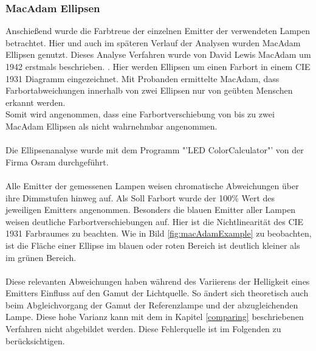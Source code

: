 \documentclass[11pt]{scrartcl}
\begin{document}
\subsubsection{MacAdam Ellipsen}
Anschießend wurde die Farbtreue der einzelnen Emitter der verwendeten Lampen betrachtet. Hier und auch im späteren Verlauf der Analysen wurden MacAdam Ellipsen
genutzt. Dieses Analyse Verfahren wurde von David Lewis MacAdam um 1942 erstmals beschrieben. \cite{macAdam}. Hier werden Ellipsen um einen Farbort in einem CIE
1931 Diagramm eingezeichnet. Mit Probanden ermittelte MacAdam, dass Farbortabweichungen innerhalb von zwei Ellipsen nur von geübten Menschen erkannt werden.\\
Somit wird angenommen, dass eine Farbortverschiebung von bis zu zwei MacAdam Ellipsen als nicht wahrnehmbar angenommen.\\ %
\\
Die Ellipsenanalyse wurde mit dem Programm "'LED ColorCalculator"' von der Firma Osram durchgeführt. \cite{osram}\\
\\
Alle Emitter der gemessenen Lampen weisen chromatische Abweichungen über ihre Dimmstufen hinweg auf. Als Soll Farbort wurde der 100\% Wert des jeweiligen Emitters
angenommen. Besonders die blauen Emitter aller Lampen weisen deutliche Farbortverschiebungen auf. Hier ist die Nichtlinearität des CIE 1931 Farbraumes zu
beachten. Wie in Bild \ref{fig:macAdamExample} zu beobachten, ist die Fläche einer Ellipse im blauen oder roten Bereich ist deutlich kleiner als im grünen Bereich.\\
\\
Diese relevanten Abweichungen haben während des Variierens der Helligkeit eines Emitters Einfluss auf den Gamut der Lichtquelle. So ändert sich theoretisch auch
beim Abgleichvorgang der Gamut der Referenzlampe und der abzugleichenden Lampe. Diese hohe Varianz kann mit dem in Kapitel \ref{comparing} beschriebenen Verfahren
nicht abgebildet werden. Diese Fehlerquelle ist im Folgenden zu berücksichtigen.
\end{document}
